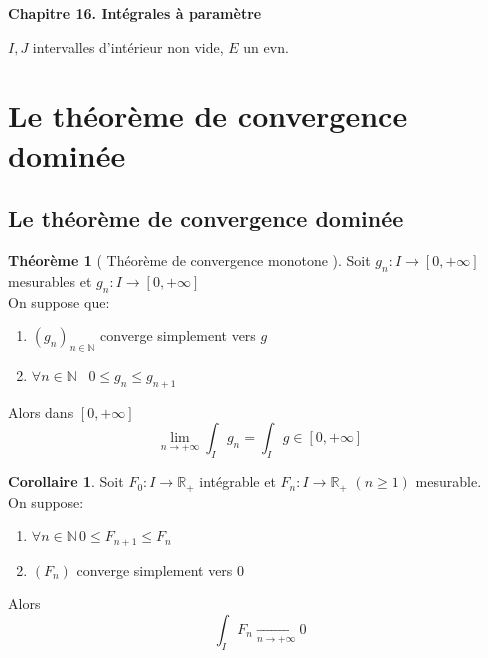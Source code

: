 \documentclass[10pt,a4paper]{article}
\theoremstyle{definition}
\newtheorem{theorem}[proposition]{Théorème}
\newtheorem{corollary}[proposition]{Corollaire}
\begin{document}
\renewcommand{\labelitemi}{\textbullet}

\renewcommand{\labelenumi}{(\roman{enumi})}

\begin{center}
{\Large \textbf{Chapitre 16. Intégrales à paramètre}}
\end{center}

\noindent \(I, J\) intervalles d'intérieur non vide, \(E\) un evn.

\renewcommand{\labelenumi}{\arabic{enumi}.}

\section{Le théorème de convergence dominée}
\subsection{Le théorème de convergence dominée}
\begin{theorem}[ Théorème de convergence monotone ]
    Soit \(g_n: I \to [0, +\infty]\) mesurables et \(g_n: I \to [0, +\infty]\) \\
    On suppose que:
    \begin{enumerate}
        \item \((g_n)_{n \in \mathbb{N}}\) converge simplement vers \(g\)
        \item \(\forall n \in \mathbb{N}\) \, \(0 \leq g_n \leq g_{n + 1}\)
    \end{enumerate}
    Alors dans \([0, +\infty]\)
    \[\lim_{n \to +\infty}\int_{I} g_n = \int_{I} g \in [0, +\infty]\]
\end{theorem}
\begin{corollary}
    Soit \(F_0 : I \to \mathbb{R}_+\) intégrable et \(F_n: I \to \mathbb{R}_+\) \((n \geq 1)\) mesurable. \\
    On suppose:
    \begin{enumerate}
        \item \(\forall n \in \mathbb{N} \, 0 \leq F_{n + 1} \leq F_n\)
        \item \((F_n)\) converge simplement vers 0
    \end{enumerate}
    Alors
    \[\int_{I} F_n \xrightarrow[n \to +\infty]{} 0\]
\end{corollary}
\end{document}
